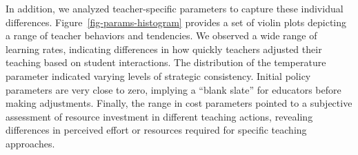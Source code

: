 \documentclass[
  number,
  preprint,
  3p,
  onecolumn]{elsarticle}
\begin{document}
In addition, we analyzed teacher-specific parameters to capture these
individual differences. Figure~\ref{fig-params-histogram} provides a set
of violin plots depicting a range of teacher behaviors and tendencies.
We observed a wide range of learning rates, indicating differences in
how quickly teachers adjusted their teaching based on student
interactions. The distribution of the temperature parameter indicated
varying levels of strategic consistency. Initial policy parameters are
very close to zero, implying a ``blank slate'' for educators before
making adjustments. Finally, the range in cost parameters pointed to a
subjective assessment of resource investment in different teaching
actions, revealing differences in perceived effort or resources required
for specific teaching approaches.

\begin{figure}

\begin{minipage}{0.33\linewidth}



\end{minipage}%
%
\begin{minipage}{0.33\linewidth}



\end{minipage}%
%
\begin{minipage}{0.33\linewidth}



\end{minipage}%
\newline
\begin{minipage}{0.33\linewidth}

\centering{

}
\end{minipage}
\end{figure}
\end{document}
